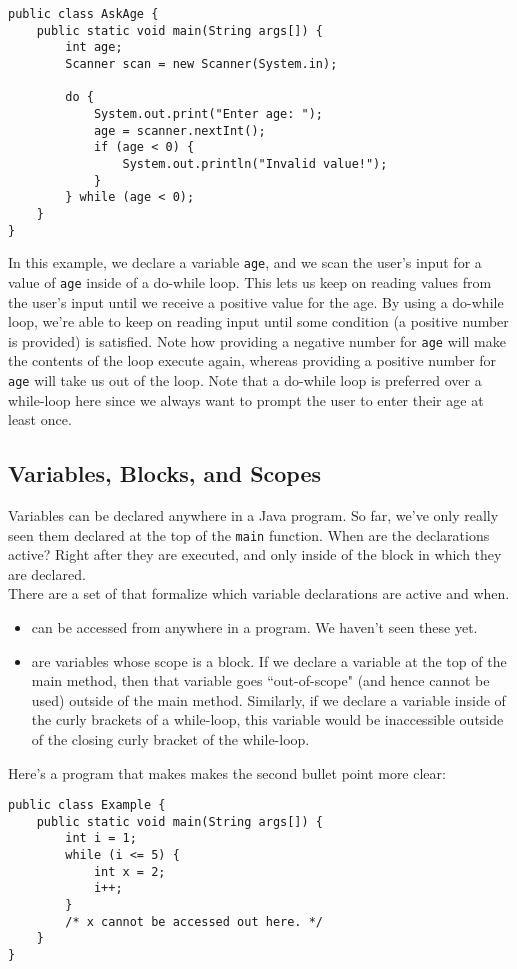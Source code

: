 \begin{lstlisting}
public class AskAge {
    public static void main(String args[]) {
        int age;
        Scanner scan = new Scanner(System.in);
        
        do {
            System.out.print("Enter age: ");
            age = scanner.nextInt();
            if (age < 0) {
                System.out.println("Invalid value!");
            }
        } while (age < 0);
    }
}
\end{lstlisting}

In this example, we declare a variable \verb!age!, and we scan the user's input for a value of \verb!age! inside of a do-while loop. This lets us keep on reading values from the user's input until we receive a positive value for the age. By using a do-while loop, we're able to keep on reading input until some condition (a positive number is provided) is satisfied. Note how providing a negative number for \verb!age! will make the contents of the loop execute again, whereas providing a positive number for \verb!age! will take us out of the loop. Note that a do-while loop is preferred over a while-loop here since we always want to prompt the user to enter their age at least once. \\


\subsection{Variables, Blocks, and Scopes}

Variables can be declared anywhere in a Java program. So far, we've only really seen them declared at the top of the \verb!main! function. When are the declarations active? Right after they are executed, and only inside of the block in which they are declared. \\

There are a set of  that formalize which variable declarations are active and when. 

\begin{itemize}
    \item {} can be accessed from anywhere in a program. We haven't seen these yet. 
    \item {} are variables whose scope is a block. If we declare a variable at the top of the main method, then that variable goes ``out-of-scope" (and hence cannot be used) outside of the main method. Similarly, if we declare a variable inside of the curly brackets of a while-loop, this variable would be inaccessible outside of the closing curly bracket of the while-loop. 
\end{itemize}

Here's a program that makes makes the second bullet point more clear:

\begin{lstlisting}
public class Example {
    public static void main(String args[]) {
        int i = 1;
        while (i <= 5) {
            int x = 2;
            i++;
        }
        /* x cannot be accessed out here. */
    }
}
\end{lstlisting}
